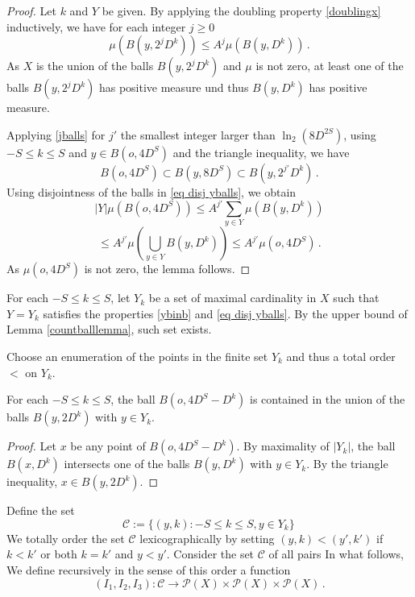 \begin{proof}
   Let $k$ and $Y$ be given.
  By applying the doubling property \eqref{doublingx} inductively, we have for each integer $j\ge 0$
  \begin{equation}\label{jballs}
      \mu(B(y,2^{j}D^k))\le A^j \mu(B(y,D^k))\, .
  \end{equation}
 As $X$ is the union of the balls $B(y,2^{j}D^k)$ and $\mu$ is not zero, at least one of
 the balls $B(y,2^{j}D^k)$ has positive measure und thus $B(y,D^k)$ has positive measure.

 Applying \eqref{jballs} for $j'$ the smallest integer larger than $\ln_2(8D^{2S})$, using $-S\le k\le S$
 and $y\in B(o,4D^S)$ and the triangle inequality, we have
   \begin{equation}
     B(o, 4D^S) \subset B(y, 8D^S) \subset B(y,2^{j'}D^k) \, .
  \end{equation}
Using disjointness of the balls in \eqref{eq disj yballs}, we obtain
\begin{equation}
|Y|\mu(B(o,4D^S))\le A^{j'}\sum_{y\in Y}\mu(B(y,D^k))
\end{equation}
\begin{equation}
\le
A^{j'}\mu(\bigcup_{y\in Y}B(y,D^k))
\le A^{j'}\mu(o,4D^S)\, .
\end{equation}
As $\mu(o,4D^S)$ is not zero, the lemma follows.
\end{proof}

For each $-S\le k\le S$, let $Y_k$ be a set of
maximal cardinality in $X$ such that $Y=Y_k$ satisfies
the properties \eqref{ybinb} and \eqref{eq disj yballs}.
By the upper bound of Lemma \ref{countballlemma}, such set exists.

Choose an enumeration of the points in the finite set $Y_k$ and thus a total
order  $<$ on $Y_{k}$.

\begin{lemma}\label{ballcover}
  For each $-S\le k\le S$, the ball
  $B(o, 4D^S-D^k)$ is contained
  in the union of the balls $B(y,2D^k)$ with $y\in Y_k$.
\end{lemma}

\begin{proof}
Let $x$ be any point of $B(o, 4D^S-D^k)$.   By maximality of $|Y_k|$, the ball
$B(x,  D^k)$ intersects one of the balls
$B(y,  D^k)$ with $y\in Y_k$. By the triangle
inequality, $x\in B(y,2D^k)$.
\end{proof}

Define the set
\begin{equation}
    \mathcal{C}:= \{(y,k): -S\le k\le S, y\in Y_k\}\,
\end{equation}
We totally order the set $\mathcal{C}$ lexicographically by setting
$(y,k)<(y',k')$ if $k< k'$ or both $k=k'$ and $y<y'$.
Consider the set $\mathcal{C}$ of all pairs
In what follows, We define recursively in the sense of this order a function
\begin{equation}
    (I_1,I_2,I_3): \mathcal{C}\to \mathcal{P}(X)\times \mathcal{P}(X)\times \mathcal{P}(X)\, .
\end{equation}


